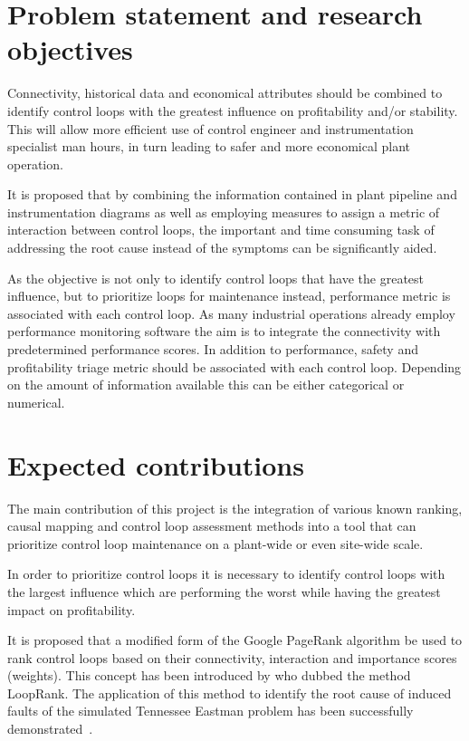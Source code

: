 \documentclass{article}
\begin{document}
%


\newpage
\section{Problem statement and research objectives}

Connectivity, historical data and economical attributes should be combined to identify control loops with the greatest influence on profitability and/or stability.
This will allow more efficient use of control engineer and instrumentation specialist man hours, in turn leading to safer and more economical plant operation.

It is proposed that by combining the information contained in plant pipeline and instrumentation diagrams as well as employing measures to assign a metric of interaction between control loops, the important and time consuming task of addressing the root cause instead of the symptoms can be significantly aided.

As the objective is not only to identify control loops that have the greatest influence, but to prioritize loops for maintenance instead, performance metric is associated with each control loop.
As many industrial operations already employ performance monitoring software the aim is to integrate the connectivity with predetermined performance scores.
In addition to performance, safety and profitability triage metric should be associated with each control loop.
Depending on the amount of information available this can be either categorical or numerical.


\newpage
\section{Expected contributions}

The main contribution of this project is the integration of various known ranking, causal mapping and control loop assessment methods into a tool that can prioritize control loop maintenance on a plant-wide or even site-wide scale.

In order to prioritize control loops it is necessary to identify control loops with the largest influence which are performing the worst while having the greatest impact on profitability.

It is proposed that a modified form of the Google PageRank algorithm be used to rank control loops based on their connectivity, interaction and importance scores (weights). This concept has been introduced by \citet{Farenzena2009} who dubbed the method LoopRank. The application of this method to identify the root cause of induced faults of the simulated Tennessee Eastman problem has been successfully demonstrated~\cite{Wilken2012}.
\end{document}
